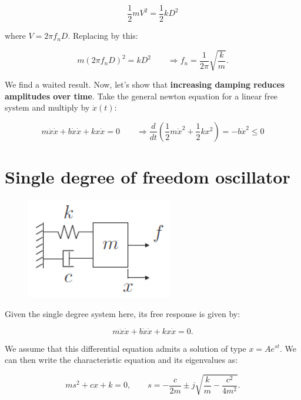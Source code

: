 			\begin{equation}
			\frac{1}{2} m V^2 = \frac{1}{2} kD^2
			\end{equation}
			
			where $V = 2\pi f_n D$. Replacing by this:
			
			\begin{equation}
			 m (2\pi f_n D)^2 = kD^2 \qquad \Rightarrow f_n = \frac{1}{2\pi}\sqrt{\frac{k}{m}}.
			\end{equation}
			
			We find a waited result. Now, let's show that \textbf{increasing damping reduces amplitudes over time}. Take the general newton equation for a linear free system and multiply by $\dot{x} (t)$:
			
			\begin{equation}
			m\ddot{x}\dot{x} + b\dot{x}\dot{x} + kx\dot{x} = 0 \qquad \Rightarrow \frac{d}{dt}\left( \frac{1}{2} m\dot{x}^2 + \frac{1}{2} kx^2 \right) = -b\dot{x}^2 \leq 0
			\end{equation}
			
	\section{Single degree of freedom oscillator}
		\begin{figure}
			\vspace{-5mm}
			\includegraphics[scale=0.6]{vibration/ch1/4}
			\end{figure}
			Given the single degree system here, its free response is given by:
			
			\begin{equation}
			m\ddot{x}\dot{x} + b\dot{x}\dot{x} + kx\dot{x} = 0.
			\end{equation}
			
			We assume that this differential equation admits a solution of type $x = Ae^{st}$. We can then write the characteristic equation and its eigenvalues as:
			
			\begin{equation}
			ms^2 + cx + k = 0, \qquad s = - \frac{c}{2m} \pm j\sqrt{\frac{k}{m} -\frac{c^2}{4m^2}}.
			\end{equation}
			
